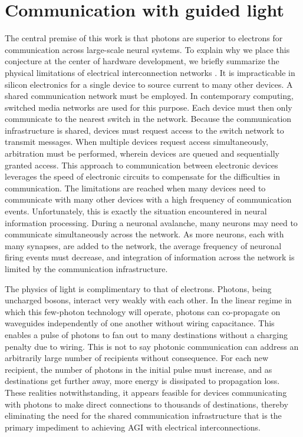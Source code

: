 \documentclass[twocolumn]{article}
\begin{document}
\section{\label{sec:communication}Communication with guided light}
The central premise of this work is that photons are superior to electrons for communication across large-scale neural systems. To explain why we place this conjecture at the center of hardware development, we briefly summarize the physical limitations of electrical interconnection networks \cite{hepa2012}. It is impracticable in silicon electronics for a single device to source current to many other devices. A shared communication network must be employed. In contemporary computing, switched media networks are used for this purpose. Each device must then only communicate to the nearest switch in the network. Because the communication infrastructure is shared, devices must request access to the switch network to transmit messages. When multiple devices request access simultaneously, arbitration must be performed, wherein devices are queued and sequentially granted access. This approach to communication between electronic devices leverages the speed of electronic circuits to compensate for the difficulties in communication. The limitations are reached when many devices need to communicate with many other devices with a high frequency of communication events. Unfortunately, this is exactly the situation encountered in neural information processing. During a neuronal avalanche, many neurons may need to communicate simultaneously across the network. As more neurons, each with many synapses, are added to the network, the average frequency of neuronal firing events must decrease, and integration of information across the network is limited by the communication infrastructure.

The physics of light is complimentary to that of electrons. Photons, being uncharged bosons, interact very weakly with each other. In the linear regime in which this few-photon technology will operate, photons can co-propagate on waveguides independently of one another without wiring capacitance. This enables a pulse of photons to fan out to many destinations without a charging penalty due to wiring. This is not to say photonic communication can address an arbitrarily large number of recipients without consequence. For each new recipient, the number of photons in the initial pulse must increase, and as destinations get further away, more energy is dissipated to propagation loss. These realities notwithstanding, it appears feasible for devices communicating with photons to make direct connections to thousands of destinations, thereby eliminating the need for the shared communication infrastructure that is the primary impediment to achieving AGI with electrical interconnections.
\end{document}
